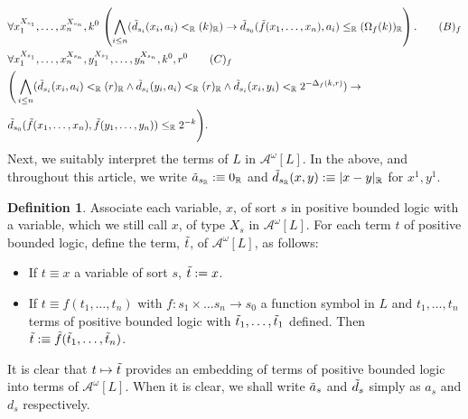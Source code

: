 \documentclass[11pt]{amsart}
\theoremstyle{definition}
\newtheorem{definition}[theorem]{Definition}
\theoremstyle{remark}
\def\RR{\mathbb{R}}
\begin{document}
\begin{align*}
&\forall x_1^{X_{s_1}},\ldots,x_n^{X_{s_n}},k^0 \,\left(\bigwedge_{i\le n} (\Tilde{d}_{s_i}(x_i,a_i) <_\RR (k)_\RR) \to \Tilde{d}_{s_0}(\Tilde{f}(x_1,\ldots,x_n),a_i) \le_\RR (\Omega_f(k))_\RR \right).\tag*{$(B)_f$}\\
&\forall x_1^{X_{s_1}},\ldots,x_n^{X_{s_n}},y_1^{X_{s_1}},\ldots,y_n^{X_{s_n}},k^0,r^0\tag*{$(C)_f$} \\
&\Bigg(\bigwedge_{i\le n} (\Tilde{d}_{s_i}(x_i,a_i) <_\RR (r)_\RR\land \Tilde{d}_{s_i}(y_i,a_i) <_\RR (r)_\RR\land \Tilde{d}_{s_i}(x_i,y_i) <_\RR 2^{-\Delta_f(k,r)}) \to\\
&\Tilde{d}_{s_0}(\Tilde{f}(x_1,\ldots,x_n),\Tilde{f}(y_1,\ldots,y_n)) \le_\RR 2^{-k} \Bigg).
\end{align*}
Next, we suitably interpret the terms of $L$ in $\mathcal{A}^\omega[L]$. In the above, and throughout this article, we write $\Tilde{a}_{s_\RR} :\equiv 0_\RR$ and $\Tilde{d}_{s_\RR}(x,y) :\equiv |x-y|_\RR$ for $x^1,y^1$.
\begin{definition}
    Associate each variable, $x$, of sort $s$ in positive bounded logic with a variable, which we still call $x$, of type $X_s$ in $\mathcal{A}^\omega[L]$. For each term $t$ of positive bounded logic, define the term, $\Tilde{t}$, of $\mathcal{A}^\omega[L]$, as follows:
       \begin{itemize}
    \item If $t\equiv x$ a variable of sort $s$, $\Tilde{t}:= x$. 
    \item If $t\equiv f(t_1,\ldots,t_n)$ with $f:s_1 \times \ldots s_n \to s_0 $ a function symbol in $L$ and $t_1,\ldots,t_n$ terms of positive bounded logic with $\Tilde{t}_1,\ldots,\Tilde{t}_1$ defined. Then $\Tilde{t}:\equiv \Tilde{f}(\Tilde{t}_1,\ldots,\Tilde{t}_n)$. 
    \end{itemize}
\end{definition}
It is clear that $t \mapsto \Tilde{t}$ provides an embedding of terms of positive bounded logic into terms of $\mathcal{A}^\omega[L]$. When it is clear, we shall write $\Tilde{a}_s$ and $\Tilde{d}_s$ simply as $a_s$ and $d_s$ respectively.
\end{document}
